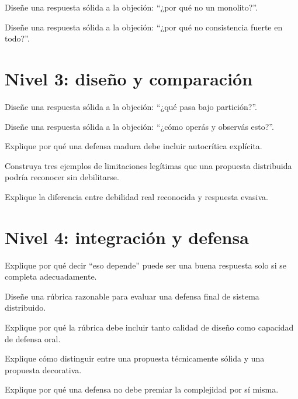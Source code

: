 \documentclass[variant=guia,cover=institutional,mode=screen]{ua-engineering-v6-article}
\begin{document}
\begin{uaexercise}
Diseñe una respuesta sólida a la objeción: “¿por qué no un monolito?”.
\end{uaexercise}

\begin{uaexercise}
Diseñe una respuesta sólida a la objeción: “¿por qué no consistencia fuerte en todo?”.
\end{uaexercise}


\section{Nivel 3: diseño y comparación}
\begin{uaexercise}
Diseñe una respuesta sólida a la objeción: “¿qué pasa bajo partición?”.
\end{uaexercise}

\begin{uaexercise}
Diseñe una respuesta sólida a la objeción: “¿cómo operás y observás esto?”.
\end{uaexercise}

\begin{uaexercise}
Explique por qué una defensa madura debe incluir autocrítica explícita.
\end{uaexercise}

\begin{uaexercise}
Construya tres ejemplos de limitaciones legítimas que una propuesta distribuida podría reconocer sin debilitarse.
\end{uaexercise}

\begin{uaexercise}
Explique la diferencia entre debilidad real reconocida y respuesta evasiva.
\end{uaexercise}


\section{Nivel 4: integración y defensa}
\begin{uaexercise}
Explique por qué decir “eso depende” puede ser una buena respuesta solo si se completa adecuadamente.
\end{uaexercise}

\begin{uaexercise}
Diseñe una rúbrica razonable para evaluar una defensa final de sistema distribuido.
\end{uaexercise}

\begin{uaexercise}
Explique por qué la rúbrica debe incluir tanto calidad de diseño como capacidad de defensa oral.
\end{uaexercise}

\begin{uaexercise}
Explique cómo distinguir entre una propuesta técnicamente sólida y una propuesta decorativa.
\end{uaexercise}

\begin{uaexercise}
Explique por qué una defensa no debe premiar la complejidad por sí misma.
\end{uaexercise}
\end{document}
